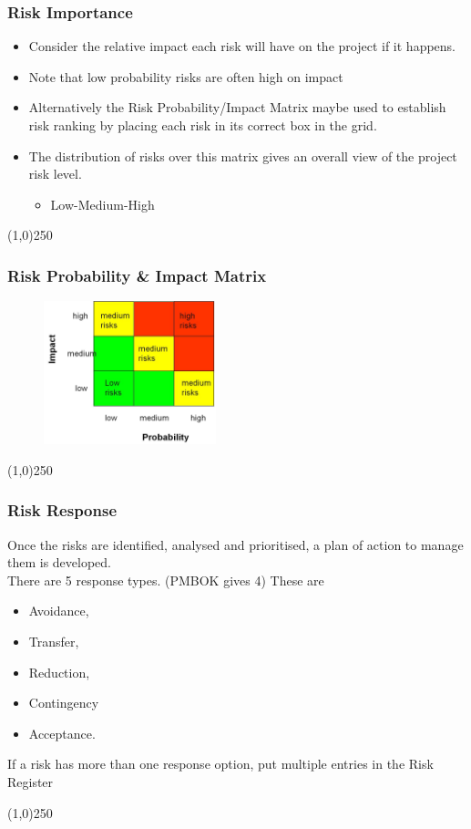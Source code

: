 \begin{frame}
\frametitle{Risk Importance}
\begin{itemize}
\item Consider the relative impact each risk will have on the project if it happens. 
\item Note that low probability risks are often high on impact 
\item Alternatively the Risk Probability/Impact Matrix maybe used to establish risk ranking by placing each risk in its correct box in the grid.
\item The distribution of risks over this matrix gives an overall view of the project risk level. 
\begin{itemize}
	\item Low-Medium-High
\end{itemize}
\end{itemize}
\end{frame}\begin{center}\line(1,0){250}\end{center}





\begin{frame}
\frametitle{Risk Probability \& Impact Matrix}
\begin{figure}
	\centering
		\includegraphics[width = 5cm]{images/Matrix2.jpg}
	\label{fig:Matrix2}
\end{figure}

\end{frame}\begin{center}\line(1,0){250}\end{center}





\begin{frame}
\frametitle{Risk Response}
Once the risks are identified, analysed and prioritised, a plan of action to manage them is developed. \\
There are 5 response types. (PMBOK gives 4) These are
\begin{itemize}
	\item Avoidance, 
\item Transfer, 
\item Reduction, 
\item Contingency  
\item Acceptance. 
\end{itemize}
If a risk has more than one response option, put multiple entries in the Risk Register

\end{frame}\begin{center}\line(1,0){250}\end{center}




